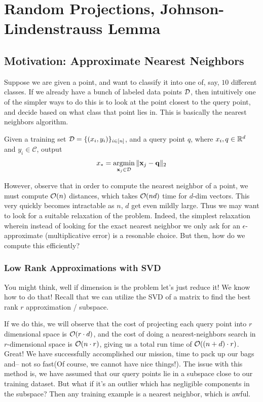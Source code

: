 \section{Random Projections, Johnson-Lindenstrauss Lemma}
    \subsection{Motivation: Approximate Nearest Neighbors}
        Suppose we are given a point, and want to classify it into one of, say, $10$
        different classes. If we already have a bunch of labeled data points $\mathcal{D}$,
        then intuitively one of the simpler ways to do this is to look at the point
        closest to the query point, and decide based on what class that point lies in.
        This is basically the nearest neighbors algorithm.
        \begin{defn}
            Given a training set $\mathcal{D} = \{ (x_i, y_i) \}_{i \in [n]}$, and a query point
            $q$, where $x_i, q \in \mathbb{R}^d$ and $y_i \in {\mathcal C}$, output
            \begin{align*}
                x_* = \operatorname*{argmin}_{\mathbf{x}_j \in \mathcal{D}} \, \lVert \mathbf{x}_j - {\mathbf{q}} \rVert_2
            \end{align*}
        \end{defn}

        However, observe that in order to compute the nearest neighbor of a point,
        we must compute $\mathcal{O}(n)$ distances, which takes $\mathcal{O}(nd)$ time for $d$-dim vectors.
        This very quickly becomes intractable as $n$, $d$ get even mildly large. Thus we
        may want to look for a suitable relaxation of the problem. Indeed, the simplest
        relaxation wherein instead of looking for the exact nearest neighbor we only ask for
        an $\epsilon$-approximate (multiplicative error) is a resonable choice. But then, how
        do we compute this efficiently?

        \subsubsection{Low Rank Approximations with SVD}
            You might think, well if dimension is the problem let's just reduce it!
            We know how to do that! Recall that we can utilize the SVD of a matrix
            to find the best rank $r$ approximation / subspace.

            If we do this, we will observe that the cost of projecting each query point
            into $r$ dimensional space is $\mathcal{O}(r \cdot d)$, and the cost of doing a
            nearest-neighbors search in $r$-dimensional space is $\mathcal{O}(n \cdot r)$,
            giving us a total run time of $\mathcal{O}((n + d) \cdot r)$. Great! We have
            successfully accomplished our mission, time to pack up our bags and-- not so fast(Of course, we cannot have nice things!).
            The issue with this method is, we have assumed that our query points lie in a subspace
            close to our training dataset. But what if it's an outlier which has negligible
            components in the subspace? Then any training example is a nearest neighbor,
            which is awful.
        
